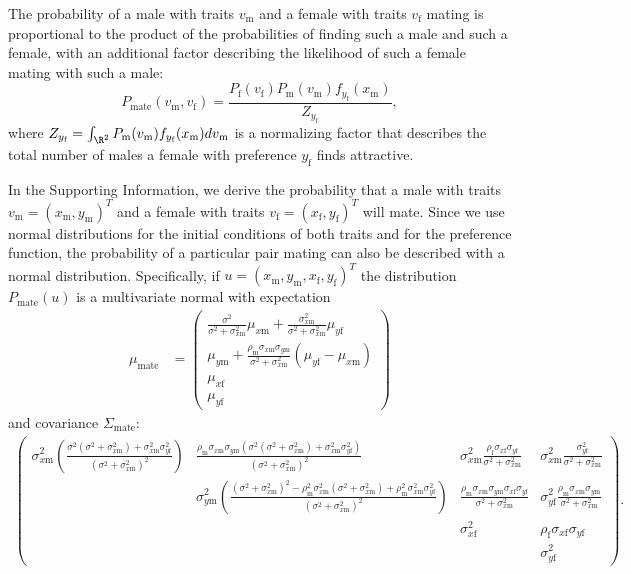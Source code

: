 \documentclass{article}
\newcommand{\x}[1]{\text{#1}}
\begin{document}
The probability of a male with traits $v_\x{m}$ and a female with traits $v_\x{f}$ mating is proportional to the product of the probabilities of finding such a male and such a female, with an additional factor describing the likelihood of such a female mating with such a male:
\begin{equation} \label{model}
P_\x{mate}(v_\x{m},v_\x{f})=\frac{P_\x{f}(v_\x{f})P_\x{m}(v_\x{m})f_{y_\x{f}}(x_\x{m})}{Z_{y_\x{f}}},
\end{equation}
where $Z_{y_\x{f}}=\int_{\R^2} P_\x{m}(v_\x{m})f_{y_\x{f}}(x_\x{m})dv_\x{m}$ is a normalizing factor that describes the total number of males a female with preference $y_\x{f}$ finds attractive.

In the Supporting Information, we derive the probability that a male with traits $v_\x{m}=(x_\x{m},y_\x{m})^T$ and a female with traits $v_\x{f}=(x_\x{f},y_\x{f})^T$ will mate. Since we use normal distributions for the initial conditions of both traits and for the preference function, the probability of a particular pair mating can also be described with a normal distribution. Specifically, if $u=(x_\x{m},y_\x{m},x_\x{f},y_\x{f})^T$ the distribution $P_\text{mate}(u)$ is a multivariate normal with expectation 
\begin{align}
\mu_\text{mate}&=\left(\begin{array}{cc} \frac{\sigma^2}{\sigma^2+\sigma_{x\x{m}}^2}\mu_{x\x{m}}+\frac{\sigma_{x\x{m}}^2}{\sigma^2+\sigma_{x\x{m}}^2}\mu_{y\x{f}} 
\\ \mu_{y\x{m}}+\frac{\rho_\x{m}\sigma_{x\x{m}}\sigma_{y\x{m}}}{\sigma^2+\sigma_{x\x{m}}^2}(\mu_{y\x{f}}-\mu_{x\x{m}})
\\ \mu_{x\x{f}}
\\ \mu_{y\x{f}}
 \end{array}\right) \label{mean}
\end{align}
and covariance $\Sigma_\text{mate}$:
\begin{align}
\left(\begin{array}{cccc}\sigma_{x\x{m}}^2\left(\frac{\sigma^2(\sigma^2+\sigma_{x\x{m}}^2)+\sigma_{x\x{m}}^2\sigma_{y\x{f}}^2}{(\sigma^2+\sigma_{x\x{m}}^2)^2}\right) & \frac{\rho_\x{m}\sigma_{x\x{m}}\sigma_{y\x{m}}(\sigma^2(\sigma^2+\sigma_{x\x{m}}^2)+\sigma_{x\x{m}}^2\sigma_{y\x{f}}^2)}{(\sigma^2+\sigma_{x\x{m}}^2)^2} & \sigma_{x\x{m}}^2\frac{\rho_\x{f}\sigma_{x\x{f}}\sigma_{y\x{f}}}{\sigma^2+\sigma_{x\x{m}}^2} &  \sigma_{x\x{m}}^2\frac{\sigma_{y\x{f}}^2}{\sigma^2+\sigma_{x\x{m}}^2}
\\ & \sigma_{y\x{m}}^2\left(\frac{(\sigma^2+\sigma_{x\x{m}}^2)^2-\rho_\x{m}^2\sigma_{x\x{m}}^2(\sigma^2+\sigma_{x\x{m}}^2)+\rho_\x{m}^2\sigma_{x\x{m}}^2\sigma_{y\x{f}}^2}{(\sigma^2+\sigma_{x\x{m}}^2)^2}\right) & \frac{\rho_\x{m}\sigma_{x\x{m}}\sigma_{y\x{m}}\sigma_{x\x{f}}\sigma_{y\x{f}}}{\sigma^2+\sigma_{x\x{m}}^2}& \sigma_{y\x{f}}^2\frac{\rho_\x{m}\sigma_{x\x{m}}\sigma_{y\x{m}}}{\sigma^2+\sigma_{x\x{m}}^2}
\\ & & \sigma_{x\x{f}}^2 & \rho_\x{f}\sigma_{x\x{f}}\sigma_{y\x{f}}
\\ & & & \sigma_{y\x{f}}^2
\end{array}\right). \label{covariance}
\end{align}
\end{document}
